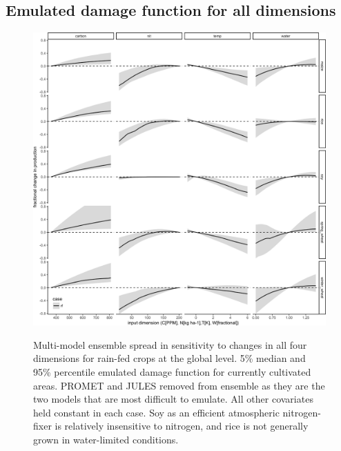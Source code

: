 \documentclass[10pt]{article}
\begin{document}
\subsection{Emulated damage function for all dimensions}
\begin{figure}[h!]
\includegraphics[width=\textwidth]{em_CTWN_all_crops.png}\\
\caption{Multi-model ensemble spread in sensitivity to changes in all four dimensions for rain-fed crops at the global level. 5\% median and 95\% percentile emulated damage function for currently cultivated areas. PROMET and JULES removed from ensemble as they are the two models that are most difficult to emulate. All other covariates held constant in each case. Soy as an efficient atmospheric nitrogen-fixer is relatively insensitive to nitrogen, and rice is not generally grown in water-limited conditions.}
\label{fig:all_dims}
\end{figure}

\end{document}
